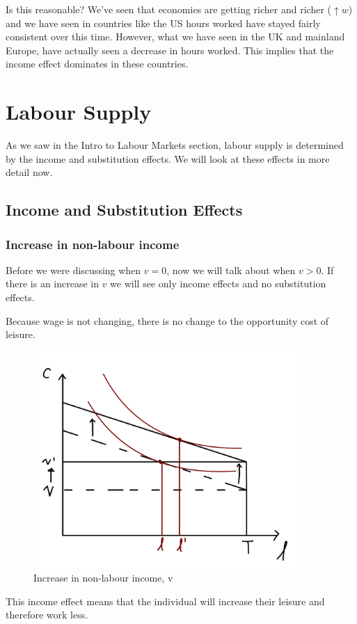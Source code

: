 \documentclass[11pt]{article}
\begin{document}
Is this reasonable? We've seen that economies are getting richer and richer ($\uparrow w$) and we have seen in countries like the US hours worked have stayed fairly consistent over this time. However, what we have seen in the UK and mainland Europe, have actually seen a decrease in hours worked. This implies that the income effect dominates in these countries.

\newpage
\section{Labour Supply}

As we saw in the Intro to Labour Markets section, labour supply is determined by the income and substitution effects. We will look at these effects in more detail now.

\subsection{Income and Substitution Effects}

\subsubsection{Increase in non-labour income}
Before we were discussing when $v=0$, now we will talk about when $v>0$. If there is an increase in $v$ we will see only income effects and no substitution effects.
\begin{intu}
    Because wage is not changing, there is no change to the opportunity cost of leisure.
\end{intu}

\begin{figure}[h]
    \centering
    \includegraphics[width=10cm]{photos/shift in v.jpeg}
    \caption{Increase in non-labour income, v}
    \label{increase in v}
\end{figure}
This income effect means that the individual will increase their leisure and therefore work less.
\end{document}
